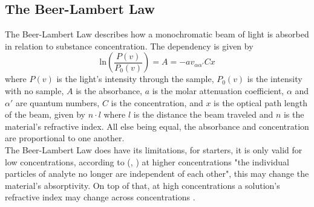 \documentclass[reprint,amsmath,amssymb,aps, prl,superscriptaddress]{revtex4-2}
\begin{document}
\subsection{The Beer-Lambert Law}
The Beer-Lambert Law describes how a monochromatic beam of light is absorbed in relation to substance concentration. The dependency is given by
\begin{equation} \label{eq:BeerLambert}
\text{ln}\left(\frac{P(v)}{P_{0}(v)}\right)=A=-av_{\alpha\alpha'}Cx
\end{equation}
where $P(v)$ is the light's intensity through the sample, $P_{0}(v)$ is the intensity with no sample, $A$ is the absorbance, $a$ is the molar attenuation coefficient, $\alpha$ and $\alpha'$ are quantum numbers, $C$ is the concentration, and $x$ is the optical path length of the beam, given by $n\cdot l$ where $l$ is the distance the beam traveled and $n$ is the material's refractive index. All else being equal, the absorbance and concentration are proportional to one another. \\
The Beer-Lambert Law does have its limitations, for starters, it is only valid for low concentrations, according to (, \cite{2020Beer}) at higher concentrations "the individual particles of analyte no longer are independent of each other", this may change the material's absorptivity. On top of that, at high concentrations a solution's refractive index may change across concentrations \cite{2020Beer}.
\end{document}
